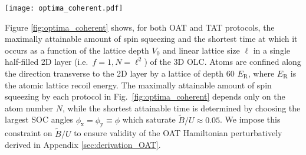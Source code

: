 \documentclass[aps,prx,superscriptaddress,notitlepage,twocolumn,longbibliography]{revtex4-2}
\renewcommand{\t}{\text} %
\newcommand{\x}{\text{x}}
\newcommand{\y}{\text{y}}
\begin{document}
\begin{figure*}
\centering
\texttt{[image: optima\_coherent.pdf]}
\caption{{\bf Optimal squeezing} with one- and two-axis twisting in a 2D section of the 3D $^{87}$Sr optical lattice clock.
({\bf a}) The maximum amount of squeezing depends only on the atom number $N=\ell^2$, where $\ell$ is the number of lattice sites along each axis of the lattice.
While the time scales for squeezing generally depend on several experimental parameters, the time at which maximal squeezing occurs can be minimized at any given lattice depth $V_0$ by choosing SOC angles $\phi$ that saturate $\widetilde{B}/U\approx0.05$, where $\widetilde{B}$ is the variance of the SOC-induced axial field and $U$ is the two-atom on-site interaction energy.
Panels ({\bf b}, {\bf c}) show these minimal squeezing times as a function of the depth $V_0$ and linear size $\ell$ of the lattice.
Lattice depths $V_0$ are normalized to the atomic lattice recoil energy $E_{\t{R}}$, and the upper axis on panels ({\bf b}, {\bf c}) marks values of  $U/J$ at fixed lattice depths.
In general, TAT achieves more squeezing than OAT for any system size, and achieves optimal squeezing faster for $N\gtrsim400$ atoms, as denoted by a dotted line in panels ({\bf b}, {\bf c}).
}
\label{fig:optima_coherent}
\end{figure*}

Figure \ref{fig:optima_coherent} shows, for both OAT and TAT protocols, the maximally attainable amount of spin squeezing and the shortest time at which it occurs as a function of the lattice depth $V_0$ and linear lattice size $\ell$ in a single half-filled 2D layer (i.e.~$f=1,N=\ell^2$) of the 3D OLC.
Atoms are confined along the direction transverse to the 2D layer by a lattice of depth 60 $E_{\t{R}}$, where $E_{\t{R}}$ is the atomic lattice recoil energy.
The maximally attainable amount of spin squeezing by each protocol in Fig.~\ref{fig:optima_coherent} depends only on the atom number $N$, while the shortest attainable time is determined by choosing the largest SOC angles $\phi_\x=\phi_\y\equiv\phi$ which saturate $\widetilde{B}/U\approx0.05$.
We impose this constraint on $\widetilde{B}/U$ to ensure validity of the OAT Hamiltonian perturbatively derived in Appendix \ref{sec:derivation_OAT}\cite{supplementary_material}.
\end{document}
